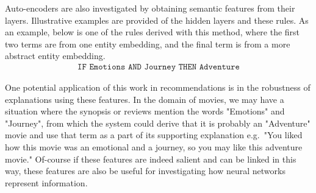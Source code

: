 Auto-encoders are also investigated by obtaining semantic features from their  layers.  Illustrative examples are provided of the hidden layers and these rules. As an example, below is one of the rules derived with this method, where the first two terms are from one entity embedding, and the final term is from a more abstract entity embedding.
\begin{align}\label{rule1}\texttt{IF Emotions  AND  Journey THEN Adventure}\end{align} 


One potential application of this work in recommendations is in the robustness of explanations using these features. In the domain of movies, we may have a situation where the synopsis or reviews mention the words "Emotions" and "Journey", from which the system could derive that it is probably an "Adventure" movie and use that term as a part of its supporting explanation e.g.\ "You liked how this movie was an emotional and a journey, so you may like this adventure movie." Of-course if these features are indeed salient and can be linked in this way, these features are also be useful for investigating how  neural networks represent information.


